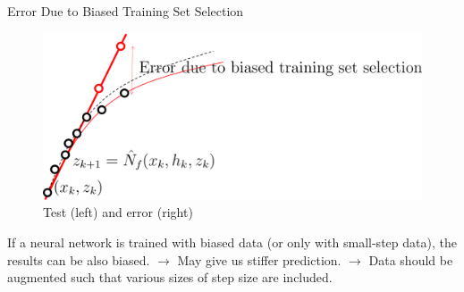 \documentclass[9pt]{beamer}
\newcounter{frame}[frame]
\begin{document}
\begin{frame}{Error Due to Biased Training Set Selection}
\begin{figure}
	\includegraphics[height=.4\textheight]{scheme02}
	\caption{Test (left) and error (right)}
\end{figure}

\vspace{.5cm}
If a neural network is trained with biased data (or only with small-step data), the results can be also biased. $\rightarrow$ May give us stiffer prediction. $\rightarrow$ Data should be augmented such that various sizes of step size are included. 
\end{frame}
\end{document}
